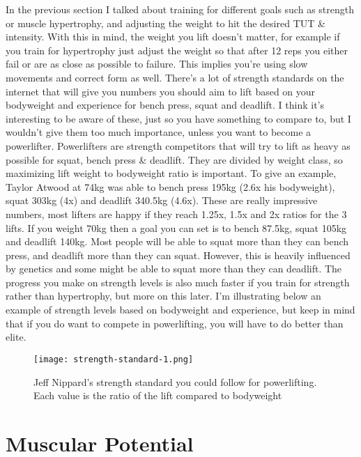 \documentclass[openany, 12pt]{book}
\begin{document}
        In the previous section I talked about training for different goals such as strength or muscle hypertrophy, and adjusting the weight to hit the desired TUT \& intensity.
        With this in mind, the weight you lift doesn't matter, for example if you train for hypertrophy just adjust the weight so that after 12 reps you either fail or are as close
        as possible to failure. This implies you're using slow movements and correct form as well. There's a lot of strength standards on the internet that will give you numbers you
        should aim to lift based on your bodyweight and experience for bench press, squat and deadlift. I think it's interesting to be aware of these, just so you have something to compare
        to, but I wouldn't give them too much importance, unless you want to become a powerlifter. Powerlifters are strength competitors that will try to lift as heavy as possible for squat,
        bench press \& deadlift. They are divided by weight class, so maximizing lift weight to bodyweight ratio is important. To give an example, Taylor Atwood
        at 74kg was able to bench press 195kg (2.6x his bodyweight), squat 303kg (4x) and deadlift 340.5kg (4.6x). These are really impressive numbers, most lifters are happy
        if they reach 1.25x, 1.5x and 2x ratios for the 3 lifts. If you weight 70kg then a goal you can set is to bench 87.5kg, squat 105kg and deadlift 140kg.
        Most people will be able to squat more than they can bench press, and deadlift more than they can squat. However, this is heavily influenced by genetics and some might be able to
        squat more than they can deadlift. The progress you make on strength levels is also much faster if you train for strength rather than hypertrophy, but more on this later. I'm
        illustrating below an example of strength levels based on bodyweight and experience, but keep in mind that if you do want to compete in powerlifting, you will have to do better
        than elite.

        \begin{figure}[h]
		\centering
		\texttt{[image: strength-standard-1.png]}
		\caption{Jeff Nippard’s strength standard you could follow for powerlifting. Each value is the ratio of the lift compared to bodyweight}
		\label{fig14}
	\end{figure}
        
        \section{Muscular Potential}
\end{document}
